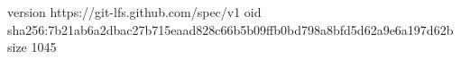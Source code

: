 version https://git-lfs.github.com/spec/v1
oid sha256:7b21ab6a2dbac27b715eaad828c66b5b09ffb0bd798a8bfd5d62a9e6a197d62b
size 1045
